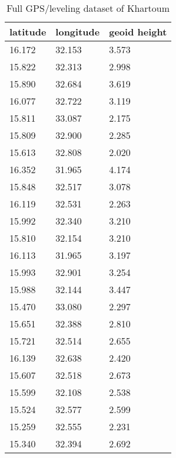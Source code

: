 \begin{table}[]
	\centering
	\caption{Full GPS/leveling dataset of Khartoum \citep{ahmed_msc}}
	\label{table:khartoum_gps_leveling_data}
	\begin{tabular}{@{}lll@{}}
		\toprule
		latitude & longitude & geoid height \\ \midrule
		16.172   & 32.153    & 3.573        \\
		15.822   & 32.313    & 2.998        \\
		15.890   & 32.684    & 3.619        \\
		16.077   & 32.722    & 3.119        \\
		15.811   & 33.087    & 2.175        \\
		15.809   & 32.900    & 2.285        \\
		15.613   & 32.808    & 2.020        \\
		16.352   & 31.965    & 4.174        \\
		15.848   & 32.517    & 3.078        \\
		16.119   & 32.531    & 2.263        \\
		15.992   & 32.340    & 3.210        \\
		15.810   & 32.154    & 3.210        \\
		16.113   & 31.965    & 3.197        \\
		15.993   & 32.901    & 3.254        \\
		15.988   & 32.144    & 3.447        \\
		15.470   & 33.080    & 2.297        \\
		15.651   & 32.388    & 2.810        \\
		15.721   & 32.514    & 2.655        \\
		16.139   & 32.638    & 2.420        \\
		15.607   & 32.518    & 2.673        \\
		15.599   & 32.108    & 2.538        \\
		15.524   & 32.577    & 2.599        \\
		15.259   & 32.555    & 2.231        \\
		15.340   & 32.394    & 2.692        \\ \bottomrule
	\end{tabular}
\end{table}